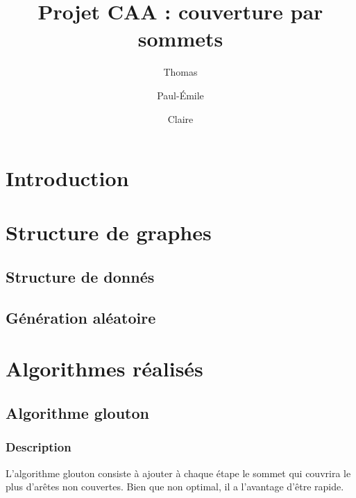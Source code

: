 \documentclass[a4paper,10pt]{article}
\title{Projet CAA : couverture par sommets}
\author{Thomas \bsc{Bellitto}\and Paul-Émile \bsc{Boutoille} \and Claire \bsc{Pennarun}}
\date{}
\begin{document}
\maketitle

\section*{Introduction}


\section{Structure de graphes}

\subsection{Structure de donnés}


\subsection{Génération aléatoire}


\section{Algorithmes réalisés}

\subsection{Algorithme glouton}

 
\subsubsection{Description}

L'algorithme glouton consiste à ajouter à chaque étape le sommet qui couvrira le plus d'arêtes non couvertes. Bien que non optimal, il a l'avantage d'être rapide. 
\end{document}
